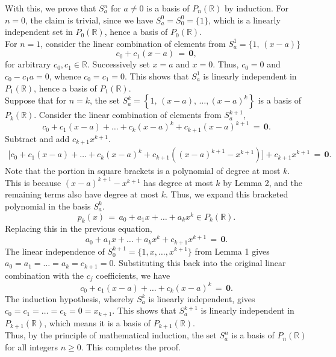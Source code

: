 \documentclass[10pt]{article}
\begin{document}
        With this, we prove that $S_a^n$ for $a \neq 0$ is a basis of $P_n(\mathbb{R})$ by induction. 
        For $n = 0$, the claim is trivial, since we have $S_a^0 = S_0^0 = \{1\}$, which is a linearly independent set in $P_0(\mathbb{R})$,
        hence a basis of $P_0(\mathbb{R})$. \\

        For $n = 1$, consider the linear combination of elements from $S_a^1 = \{1,\, (x - a)\}$
        \[
                c_0 + c_1(x - a) \,=\, \mathbf{0},
        \]
        for arbitrary $c_0, c_1 \in \mathbb{R}$.
        Successively set $x = a$ and $x = 0$.
        Thus, $c_0 = 0$ and $c_0 - c_1a = 0$, whence $c_0 = c_1 = 0$.
        This shows that $S_a^1$ is linearly independent in $P_1(\mathbb{R})$, hence a basis of $P_1(\mathbb{R})$. \\

        Suppose that for $n = k$, the set $S_a^k = \left\{1,\, (x - a),\, \dots, (x - a)^k\right\}$ is a basis of $P_k(\mathbb{R})$.
        Consider the linear combination of elements from $S_a^{k + 1}$,
        \[
                c_0 + c_1(x - a) + \dots + c_k(x - a)^k + c_{k + 1}(x - a)^{k + 1} \,=\, \mathbf{0}.
        \]
        Subtract and add $c_{k + 1}x^{k + 1}$.
        \begin{align*}
                \Big[c_0 + c_1(x - a) + \dots 
                + c_k(x - a)^k + c_{k + 1}\left((x - a)^{k + 1} - x^{k + 1}\right)\Big] + c_{k + 1}x^{k + 1} \,=\, \mathbf{0}.
        \end{align*}
        Note that the portion in square brackets is a polynomial of degree at most $k$.
        This is because $(x - a)^{k + 1} - x^{k + 1}$ has degree at most $k$ by Lemma 2, and the remaining terms also have degree at most $k$.
        Thus, we expand this bracketed polynomial in the basis $S_a^k$.
        \[
                p_k(x) \,=\, a_0 + a_1x + \dots + a_kx^k \in P_k(\mathbb{R}).
        \]
        Replacing this in the previous equation,
        \[
                a_0 + a_1x + \dots + a_kx^k + c_{k + 1}x^{k + 1} \,=\, \mathbf{0}.
        \]
        The linear independence of $S_0^{k + 1} = \{1, x, \dots, x^{k + 1}\}$ from Lemma 1 gives $a_0 = a_1 = \dots = a_k = c_{k + 1} = 0$.
        Substituting this back into the original linear combination with the $c_j$ coefficients, we have
        \[
                c_0 + c_1(x - a) + \dots + c_k(x - a)^k \,=\, \mathbf{0}.
        \]
        The induction hypothesis, whereby $S_a^k$ is linearly independent, gives $c_0 = c_1 = \dots = c_k = 0 = x_{k + 1}$.
        This shows that $S_a^{k + 1}$ is linearly independent in $P_{k + 1}(\mathbb{R})$, which means it is a basis of $P_{k + 1}(\mathbb{R})$. \\

        Thus, by the principle of mathematical induction, the set $S_a^n$ is a basis of $P_n(\mathbb{R})$ for all integers $n \geq 0$.
        This completes the proof.
\end{document}
